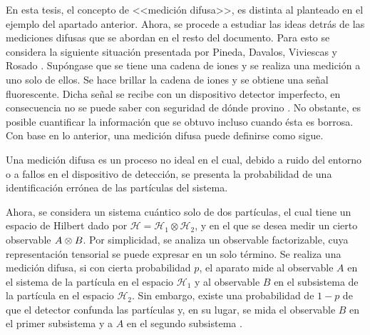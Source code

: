 En esta tesis, el concepto de <<medición difusa>>, es distinta al planteado en el ejemplo del apartado anterior.  Ahora, se procede a estudiar las ideas detrás de las mediciones difusas que se abordan en el resto del documento. 
Para esto se considera la siguiente situación presentada por Pineda, Davalos, Viviescas y Rosado {\cite{Pineda_2021}}. Supóngase que se tiene una cadena de iones y se realiza una medición a uno solo de ellos. Se hace brillar la cadena de iones y se obtiene una señal fluorescente. Dicha señal se recibe con un dispositivo detector imperfecto, en consecuencia no se puede saber con seguridad de dónde provino {\cite{Pineda_2021}}. No obstante, es posible cuantificar la información que se obtuvo incluso cuando ésta es borrosa.  Con base en lo anterior, una medición difusa puede definirse como sigue. 



\begin{definition}Una medición difusa es un proceso no ideal en el cual, debido a ruido del entorno o a fallos en el dispositivo de detección, se presenta la probabilidad de una identificación errónea de las partículas del sistema.
\end{definition}


Ahora, se considera un sistema cuántico solo de dos partículas, el cual tiene un espacio de Hilbert dado por $\mathcal{H}=\mathcal{H}_1\otimes \mathcal{H}_2$, y en el que se desea medir un cierto observable $A\otimes B$.  Por simplicidad, se analiza un observable factorizable, cuya representación tensorial se puede expresar en un solo término. Se realiza una medición difusa, si con cierta probabilidad $p$, el aparato mide al observable $A$ en el sistema de la partícula en el espacio $\mathcal{H}_1$ y al observable $B$ en el subsistema de la partícula en el espacio $\mathcal{H}_2$. Sin embargo, existe una probabilidad de $1-p$ de que el detector confunda las partículas y, en su lugar, se mida el observable $B$ en el primer subsistema y a $A$ en el segundo subsistema {\cite{Pineda_2021}}.


